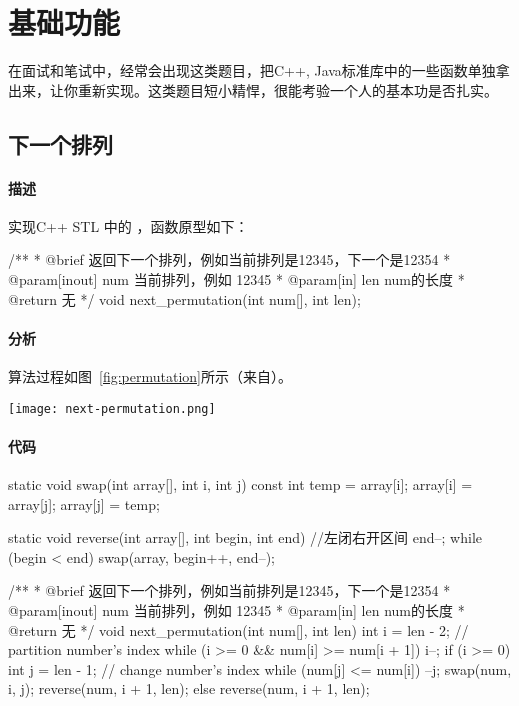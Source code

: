 \chapter{基础功能}
在面试和笔试中，经常会出现这类题目，把C++, Java标准库中的一些函数单独拿出来，让你重新实现。这类题目短小精悍，很能考验一个人的基本功是否扎实。

\section{下一个排列} %

\subsubsection{描述}
实现C++ STL 中的 ，函数原型如下：

\begin{Code}
/**
 * @brief 返回下一个排列，例如当前排列是12345，下一个是12354
 * @param[inout] num 当前排列，例如 12345
 * @param[in] len num的长度
 * @return 无
 */
void next_permutation(int num[], int len);
\end{Code}

\subsubsection{分析}
算法过程如图~\ref{fig:permutation}所示（来自）。

\begin{center}
\texttt{[image: next-permutation.png]}\\
\label{fig:permutation}
\end{center}

\subsubsection{代码}

\begin{Codex}[label=next_permutation.c]
static void swap(int array[], int i, int j) {
    const int temp = array[i];
    array[i] = array[j];
    array[j] = temp;
}

static void reverse(int array[], int begin, int end) { //左闭右开区间
    end--;
    while (begin < end)
        swap(array, begin++, end--);
}

/**
 * @brief 返回下一个排列，例如当前排列是12345，下一个是12354
 * @param[inout] num 当前排列，例如 12345
 * @param[in] len num的长度
 * @return 无
 */
void next_permutation(int num[], int len) {
    int i = len - 2;  // partition number's index
    while (i >= 0 && num[i] >= num[i + 1])
        i--;
    if (i >= 0) {
        int j = len - 1;  // change number's index
        while (num[j] <= num[i])
            --j;
        swap(num, i, j);
        reverse(num, i + 1, len);
    } else {
        reverse(num, i + 1, len);
    }
}
\end{Codex}


